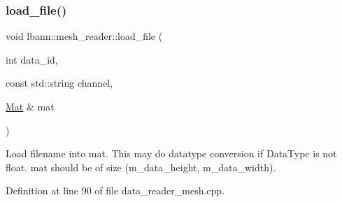 \subsubsection{\texorpdfstring{load\+\_\+file()}{load\_file()}}
{\footnotesize\ttfamily void lbann\+::mesh\+\_\+reader\+::load\+\_\+file (\begin{DoxyParamCaption}\item[{int}]{data\+\_\+id,  }\item[{const std\+::string}]{channel,  }\item[{\hyperlink{base_8hpp_a68f11fdc31b62516cb310831bbe54d73}{Mat} \&}]{mat }\end{DoxyParamCaption})\hspace{0.3cm}{\ttfamily [protected]}}

Load filename into mat. This may do datatype conversion if Data\+Type is not float. mat should be of size (m\+\_\+data\+\_\+height, m\+\_\+data\+\_\+width). 

Definition at line 90 of file data\+\_\+reader\+\_\+mesh.\+cpp.


